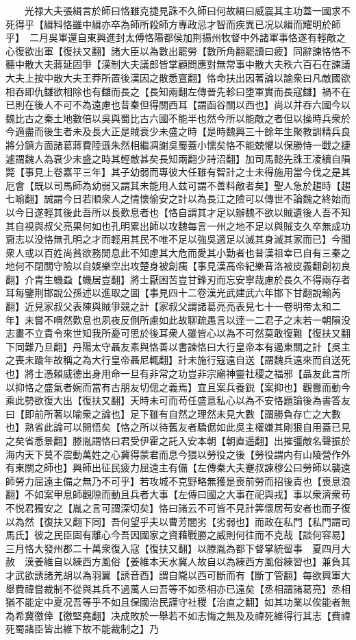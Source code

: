 　　光禄大夫張緝言於師曰恪雖克捷見誅不久師曰何故緝曰威震其主功蓋一國求不死得乎【緝料恪雖中緝亦卒為師所殺師方專政忌才智而疾異已况以緝而耀明於師乎】　二月吳軍還自東興進封太傅恪陽都侯加荆揚州牧督中外諸軍事恪遂有輕敵之心復欲出軍【復扶又翻】諸大臣以為數出罷勞【數所角翻罷讀曰疲】同辭諫恪恪不聽中散大夫蔣延固爭【漢制大夫議郎皆掌顧問應對無常事中散大夫秩六百石在諫議大夫上按中散大夫王莽所置後漢因之散悉亶翻】恪命扶出因著論以諭衆曰凡敵國欲相吞即仇讎欲相除也有讎而長之【長知兩翻左傳晉先軫曰堕軍實而長寇讎】禍不在已則在後人不可不為遠慮也昔秦但得關西耳【謂函谷關以西也】尚以并吞六國今以魏比古之秦土地數倍以吳與蜀比古六國不能半也然今所以能敵之者但以操時兵衆於今適盡而後生者未及長大正是賊衰少未盛之時【是時魏興三十餘年生聚教訓精兵良將分鎮方面諸葛蔣費陸遜朱然相繼凋謝吳蜀蓋小懦矣恪不能兢懼以保勝恃一戰之捷遽謂魏人為衰少未盛之時其輕敵甚矣長知兩翻少詩沼翻】加司馬懿先誅王凌續自隕斃【事見上卷嘉平三年】其子幼弱而專彼大任雖有智計之士未得施用當今伐之是其厄會【既以司馬師為幼弱又謂其未能用人兹可謂不善料敵者矣】聖人急於趨時【趨七喻翻】誠謂今日若順衆人之情懷偷安之計以為長江之險可以傳世不論魏之終始而以今日遂輕其後此吾所以長歎息者也【恪自謂其才足以辦魏不欲以賊遺後人吾不知其自視與叔父亮果何如也孔明累出師以攻魏每言一州之地不足以與賊支久卒無成功齎志以没恪無孔明之才而輕用其民不唯不足以強吳適足以滅其身滅其家而已】今聞衆人或以百姓尚貧欲務閒息此不知慮其大危而愛其小勤者也昔漢祖幸已自有三秦之地何不閉關守險以自娛樂空出攻楚身被創痍【事見漢高帝紀樂音洛被皮義翻創初良翻】介胄生蟣蝨【蟣居豈翻】將士厭困苦豈甘鋒刃而忘安寧哉慮於長久不得兩存者耳每鑒荆邯說公孫述以進取之圖【事見四十二卷漢光武建武六年邯下甘翻說輸芮翻】近見家叔父表陳與賊爭競之計【家叔父謂諸葛亮亮表見七十一卷明帝太和二年】未嘗不喟然歎息也夙夜反側所慮如此故聊疏愚言以逹一二君子之末若一朝隕没志畫不立貴令來世知我所憂可思於後耳衆人雖皆心以為不可然莫敢復難【復扶又翻下同難乃旦翻】丹陽太守聶友素與恪善以書諫恪曰大行皇帝本有遏東關之計【吳主之喪未踰年故稱之為大行皇帝聶尼輒翻】計未施行寇遠自送【謂魏兵遠來而自送死也】將士憑賴威德出身用命一旦有非常之功豈非宗廟神靈社稷之福邪【聶友此言所以抑恪之盛氣者婉而當有古朋友切偲之義焉】宜且案兵養鋭【案抑也】觀釁而動今乘此勢欲復大出【復扶又翻】天時未可而苟任盛意私心以為不安恪題論後為書答友曰【即前所著以喻衆之論也】足下雖有自然之理然未見大數【謂勝負存亡之大數也】熟省此論可以開悟矣【恪之所以待舊友者驕倨如此吳主權嫌其剛狠自用蓋已見之矣省悉景翻】滕胤謂恪曰君受伊霍之託入安本朝【朝直遥翻】出摧彊敵名聲振於海内天下莫不震動萬姓之心冀得蒙君而息今猥以勞役之後【勞役謂内有山陵營作外有東關之師也】興師出征民疲力屈遠主有備【左傳秦大夫蹇叔諫穆公曰勞師以襲遠師勞力屈遠主備之無乃不可乎】若攻城不克野略無獲是喪前勞而招後責也【喪息浪翻】不如案甲息師觀隙而動且兵者大事【左傳曰國之大事在祀與戎】事以衆濟衆苟不悦君獨安之【胤之言可謂深切矣】恪曰諸云不可皆不見計筭懷居苟安者也而子復以為然【復扶又翻下同】吾何望乎夫以曹芳闇劣【劣弱也】而政在私門【私門謂司馬氏】彼之民臣固有離心今吾因國家之資藉戰勝之威則何往而不克哉【談何容易】三月恪大發州郡二十萬衆復入寇【復扶又翻】以滕胤為都下督掌統留事　夏四月大赦　漢姜維自以練西方風俗【姜維本天水冀人故自以為練西方風俗練習也】兼負其才武欲誘諸羌胡以為羽翼【誘音酉】謂自隴以西可斷而有【斷丁管翻】每欲興軍大舉費禕嘗裁制不從與其兵不過萬人曰吾等不如丞相亦已遠矣【丞相謂諸葛亮】丞相猶不能定中夏况吾等乎不如且保國治民謹守社稷【治直之翻】如其功業以俟能者無為希冀徼倖【徼堅堯翻】决成敗於一舉若不如志悔之無及及禕死維得行其志【費禕死蜀諸臣皆出維下故不能裁制之】乃